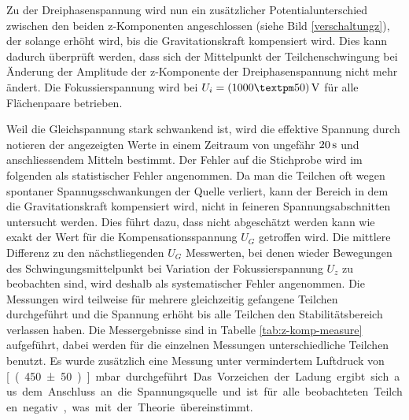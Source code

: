 \documentclass[a4paper,12pt]{article}
\begin{document}
Zu der Dreiphasenspannung wird nun ein zusätzlicher Potentialunterschied zwischen den beiden z-Komponenten angeschlossen (siehe Bild \ref{verschaltungz}), der solange erhöht wird, bis die Gravitationskraft kompensiert wird.
Dies kann dadurch überprüft werden, dass sich der Mittelpunkt der Teilchenschwingung bei Änderung der Amplitude der z-Komponente der Dreiphasenspannung nicht mehr ändert.
Die Fokussierspannung wird bei $U_i = \unit[(1000±50)]{V}$ für alle Flächenpaare betrieben.


Weil die Gleichspannung stark schwankend ist, wird die effektive Spannung durch notieren der angezeigten Werte in einem Zeitraum von ungefähr $\unit[20]{s}$ und anschliessendem Mitteln bestimmt. 
Der Fehler auf die Stichprobe wird im folgenden als statistischer Fehler angenommen.
Da man die Teilchen oft wegen spontaner Spannugsschwankungen der Quelle verliert, kann der Bereich in dem die Gravitationskraft kompensiert wird, nicht in feineren Spannungsabschnitten untersucht werden.
Dies führt dazu, dass nicht abgeschätzt werden kann wie exakt der Wert für die Kompensationsspannung $U_G$ getroffen wird.
Die mittlere Differenz zu den nächstliegenden $U_G$ Messwerten, bei denen wieder Bewegungen des Schwingungsmittelpunkt bei Variation der Fokussierspannung $U_z$ zu beobachten sind,
wird deshalb als systematischer Fehler angenommen.
Die Messungen wird teilweise für mehrere gleichzeitig gefangene Teilchen durchgeführt und die Spannung erhöht bis alle Teilchen den Stabilitätsbereich verlassen haben. Die Messergebnisse sind in
Tabelle \ref{tab:z-komp-measure} aufgeführt, dabei werden für die einzelnen Messungen unterschiedliche Teilchen benutzt. Es wurde zusätzlich eine Messung unter vermindertem Luftdruck von
 \unit[(450±50)]{mbar} durchgeführt.
Das Vorzeichen der Ladung ergibt sich aus dem Anschluss an die Spannungsquelle und ist für alle beobachteten Teilchen negativ, was mit der Theorie übereinstimmt.
\end{document}
